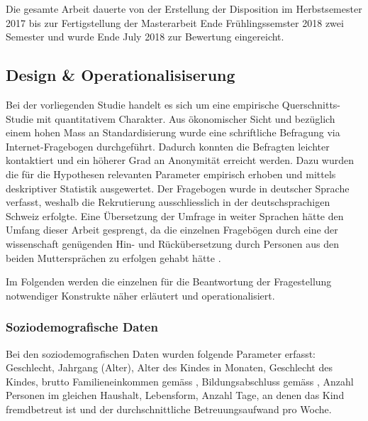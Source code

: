 Die gesamte Arbeit dauerte von der Erstellung der Disposition im Herbstsemester 2017 bis zur Fertigstellung der Masterarbeit Ende Frühlingssemster 2018 zwei Semester und wurde Ende July 2018 zur Bewertung eingereicht.

\subsection{Design \& Operationalisiserung} \label{sec:Design}
Bei der vorliegenden Studie handelt es sich um eine empirische Querschnitts-Studie mit quantitativem Charakter. Aus ökonomischer Sicht und bezüglich einem hohen Mass an Standardisierung \cite[S.~86ff]{sedlmeier2008} wurde eine schriftliche Befragung via Internet-Fragebogen durchgeführt. Dadurch konnten die Befragten leichter kontaktiert und ein höherer Grad an Anonymität erreicht werden. Dazu wurden die für die Hypothesen relevanten Parameter empirisch erhoben und mittels deskriptiver Statistik ausgewertet. Der Fragebogen wurde in deutscher Sprache verfasst, weshalb die Rekrutierung ausschliesslich in der deutschsprachigen Schweiz erfolgte. Eine Übersetzung der Umfrage in weiter Sprachen hätte den Umfang dieser Arbeit gesprengt, da die einzelnen Fragebögen durch eine der wissenschaft genügenden Hin- und Rückübersetzung durch Personen aus den beiden Muttersprächen zu erfolgen gehabt hätte \cite{Pfetsch2016}.

Im Folgenden werden die einzelnen für die Beantwortung der Fragestellung notwendiger Konstrukte näher erläutert und operationalisiert.

\subsubsection{Soziodemografische Daten}\label{sec:SoziodemografischeDaten}
Bei den soziodemografischen Daten wurden folgende Parameter erfasst: Geschlecht, Jahrgang (Alter), Alter des Kindes in Monaten, Geschlecht des Kindes, brutto Familieneinkommen gemäss , Bildungsabschluss gemäss , Anzahl Personen im gleichen Haushalt, Lebensform, Anzahl Tage, an denen das Kind fremdbetreut ist und der durchschnittliche Betreuungsaufwand pro Woche.


